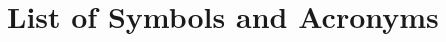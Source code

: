 \renewcommand*{\SectDir}{sections/00-preface}


\newpage

\newpage

\newpage

\listoffigures
\listoftables 

\section*{List of Symbols and Acronyms}

\newpage


